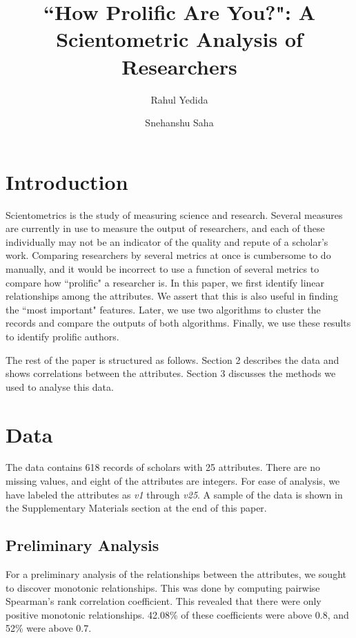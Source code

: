 \documentclass[12pt,a4paper,twocolumn]{article}
\title{``How Prolific Are You?": A Scientometric Analysis of Researchers}
\author[1]{Rahul Yedida}
\author[1]{Snehanshu Saha}
\affil[1]{Department of Computer Science \& Engineering, PESIT South Campus}
\date{}
\begin{document}
\maketitle


\section{Introduction}
Scientometrics is the study of measuring science and research. Several measures are currently in use to measure the output of researchers, and each of these individually may not be an indicator of the quality and repute of a scholar's work. Comparing researchers by several metrics at once is cumbersome to do manually, and it would be incorrect to use a function of several metrics to compare how ``prolific" a researcher is. In this paper, we first identify linear relationships among the attributes. We assert that this is also useful in finding the ``most important" features. Later, we use two algorithms to cluster the records and compare the outputs of both algorithms. Finally, we use these results to identify prolific authors. 

The rest of the paper is structured as follows. Section 2 describes the data and shows correlations between the attributes. Section 3 discusses the methods we used to analyse this data.

\section{Data}
The data contains 618 records of scholars with 25 attributes. There are no missing values, and eight of the attributes are integers. For ease of analysis, we have labeled the attributes as \textit{v1} through \textit{v25}. A sample of the data is shown in the Supplementary Materials section at the end of this paper.

\subsection{Preliminary Analysis}
For a preliminary analysis of the relationships between the attributes, we sought to discover monotonic relationships. This was done by computing pairwise Spearman's rank correlation coefficient. This revealed that there were only positive monotonic relationships. 42.08\% of these coefficients were above 0.8, and 52\% were above 0.7.
\end{document}
